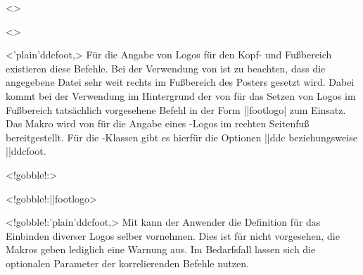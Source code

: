 \begin{DeclareEntity}{}
\begin{Declaration}
  {}
  <>
\begin{Declaration}
  {}
  <>
\begin{Declaration}
  {}
  <\Option'plain'{ddcfoot},>
\printdeclarationlist
%
Für die Angabe von Logos für den Kopf- und Fußbereich existieren diese Befehle. 
Bei der Verwendung von  ist zu 
beachten, dass die angegebene Datei sehr weit rechts im Fußbereich des Posters 
gesetzt wird. Dabei kommt bei der Verwendung im Hintergrund der von \TUDScript 
für das Setzen von Logos im Fußbereich tatsächlich vorgesehene Befehl in der 
Form \Macro||{footlogo|}
zum Einsatz. Das Makro  wird von  für 
die Angabe eines \DDC-Logos im rechten Seitenfuß bereitgestellt. Für die 
\TUDScript-Klassen gibt es hierfür die Optionen \Option||{ddc} beziehungsweise 
\Option||{ddcfoot}.
\end{Declaration}
\end{Declaration}
\end{Declaration}

\begin{Declaration}
  {}
  <!gobble!:>
\begin{Declaration}
  {}
  <!gobble!:\Macro||{footlogo}>
\begin{Declaration}
  {}
  <!gobble!:\Option'plain'{ddcfoot},>
\printdeclarationlist
%
Mit  kann der Anwender die Definition für das Einbinden 
diverser Logos selber vornehmen. Dies ist für \TUDScript nicht vorgesehen, 
die Makros geben lediglich eine Warnung aus. Im Bedarfsfall lassen sich die 
optionalen Parameter der korrelierenden Befehle nutzen. 
\end{Declaration}
\end{Declaration}
\end{Declaration}


\end{DeclareEntity}
